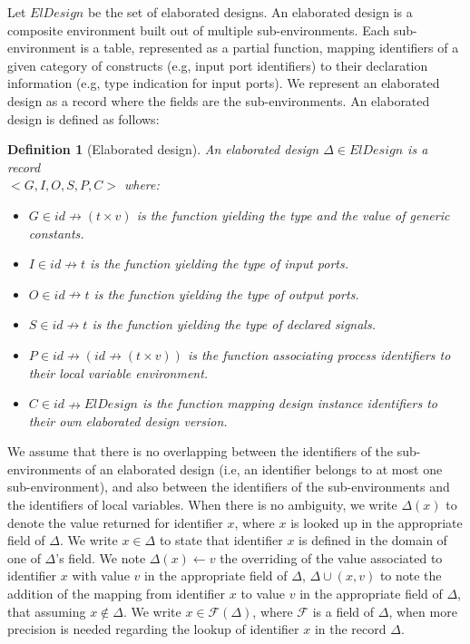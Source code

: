 \documentclass[pdflatex,sn-mathphys]{sn-jnl}%
\theoremstyle{thmstyleone}%
\theoremstyle{thmstyletwo}%
\theoremstyle{thmstylethree}%
\newtheorem{definition}{Definition}%
\begin{document}
Let $ElDesign$ be the set of elaborated designs. An elaborated design
is a composite environment built out of multiple sub-environments.
Each sub-environment is a table, represented as a partial function,
mapping identifiers of a given category of constructs (e.g, input port
identifiers) to their declaration information (e.g, type indication
for input ports). We represent an elaborated design as a record where
the fields are the sub-environments. An elaborated design is defined
as follows:

\begin{definition}[Elaborated design]
  \label{def:elab-design}
  An elaborated design $\Delta\in{}ElDesign$ is a record\\
  ${<}G, I, O, S, P, C{>}$ where:
  \begin{itemize}[label=$-$]
  \item $G\in{}id\nrightarrow{}(t\times{}v)$
    is the function yielding the type and the value of generic
    constants.
  \item $I\in{}id\nrightarrow{}t$ is the function
    yielding the type of input ports.
  \item $O\in{}id\nrightarrow{}t$ is the function
    yielding the type of output ports.
  \item
    $S\in{}id\nrightarrow{}t$
    is the function yielding the type of declared signals.
  \item $P\in{}id\nrightarrow(id\nrightarrow{}(t\times{}v))$ is the
    function associating process identifiers to their local variable
    environment.
  \item $C\in{}id{}\nrightarrow{}ElDesign$ is the function mapping
    design instance identifiers to their own elaborated design
    version.
  \end{itemize}
\end{definition}

We assume that there is no overlapping between the identifiers of the
sub-environments of an elaborated design (i.e, an identifier belongs
to at most one sub-environment), and also between the identifiers of
the sub-environments and the identifiers of local variables. When
there is no ambiguity, we write $\Delta(x)$ to denote the value
returned for identifier $x$, where $x$ is looked up in the appropriate
field of $\Delta$. We write $x\in\Delta$ to state that identifier $x$
is defined in the domain of one of $\Delta$'s field. We note
$\Delta(x)\leftarrow{}v$ the overriding of the value associated to
identifier $x$ with value $v$ in the appropriate field of $\Delta$,
$\Delta\cup{}(x,v)$ to note the addition of the mapping from
identifier $x$ to value $v$ in the appropriate field of $\Delta$, that
assuming $x\notin\Delta$. We write $x\in\mathcal{F}(\Delta)$, where
$\mathcal{F}$ is a field of $\Delta$, when more precision is needed
regarding the lookup of identifier $x$ in the record $\Delta$.\\
\end{document}
